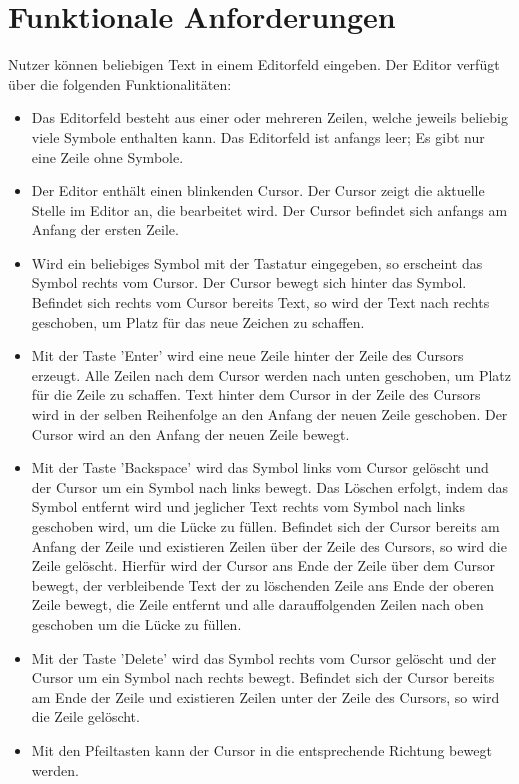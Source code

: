 \documentclass[parskip=full,11pt,twoside]{scrartcl}
\begin{document}
\section{Funktionale Anforderungen}
Nutzer können beliebigen Text in einem Editorfeld eingeben. 
Der Editor verfügt über die folgenden Funktionalitäten:
\begin{itemize}
	\item Das Editorfeld besteht aus einer oder mehreren Zeilen, welche jeweils beliebig viele Symbole enthalten kann. Das Editorfeld ist anfangs leer; Es gibt nur eine Zeile ohne Symbole.
	\item Der Editor enthält einen blinkenden Cursor. Der Cursor zeigt die aktuelle Stelle im Editor an, die bearbeitet wird. Der Cursor befindet sich anfangs am Anfang der ersten Zeile.
	\item Wird ein beliebiges Symbol mit der Tastatur eingegeben, so erscheint das Symbol rechts vom Cursor. Der Cursor bewegt sich hinter das Symbol. Befindet sich rechts vom Cursor bereits Text, so wird der Text nach rechts geschoben, um Platz für das neue Zeichen zu schaffen. 
	\item Mit der Taste 'Enter' wird eine neue Zeile hinter der Zeile des Cursors erzeugt. 
	Alle Zeilen nach dem Cursor werden nach unten geschoben, um Platz für die Zeile zu schaffen. 
	Text hinter dem Cursor in der Zeile des Cursors wird in der selben Reihenfolge an den Anfang der neuen Zeile geschoben.
	Der Cursor wird an den Anfang der neuen Zeile bewegt.
	\item Mit der Taste 'Backspace' wird das Symbol links vom Cursor gelöscht und der Cursor um ein Symbol nach links bewegt. 
	Das Löschen erfolgt, indem das Symbol entfernt wird und jeglicher Text rechts vom Symbol nach links geschoben wird, um die Lücke zu füllen.
	Befindet sich der Cursor bereits am Anfang der Zeile und existieren Zeilen über der Zeile des Cursors, so wird die Zeile gelöscht. 
	Hierfür wird der Cursor ans Ende der Zeile über dem Cursor bewegt, der verbleibende Text der zu löschenden Zeile ans Ende der oberen Zeile bewegt, die Zeile entfernt und alle darauffolgenden Zeilen nach oben geschoben um die Lücke zu füllen.
	\item Mit der Taste 'Delete' wird das Symbol rechts vom Cursor gelöscht und der Cursor um ein Symbol nach rechts bewegt.
	Befindet sich der Cursor bereits am Ende der Zeile und existieren Zeilen unter der Zeile des Cursors, so wird die Zeile gelöscht. 
	\item Mit den Pfeiltasten kann der Cursor in die entsprechende Richtung bewegt werden. 

\end{itemize}
\end{document}
